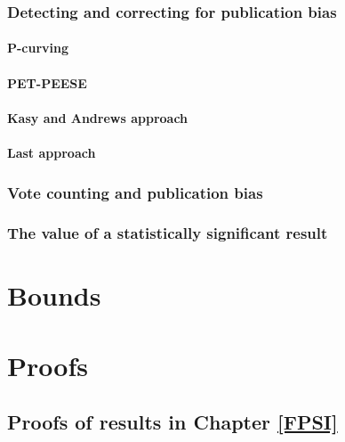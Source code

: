 \documentclass[]{book}
\theoremstyle{definition}
\theoremstyle{definition}
\theoremstyle{definition}
\theoremstyle{remark}
\begin{document}
\subsection{Detecting and correcting for publication
bias}\label{detecting-and-correcting-for-publication-bias}

\subsubsection{P-curving}\label{p-curving}

\subsubsection{PET-PEESE}\label{pet-peese}

\subsubsection{Kasy and Andrews
approach}\label{kasy-and-andrews-approach}

\subsubsection{Last approach}\label{last-approach}

\subsection{Vote counting and publication
bias}\label{vote-counting-and-publication-bias}

\subsection{The value of a statistically significant
result}\label{the-value-of-a-statistically-significant-result}

\chapter{Bounds}\label{Bounds}

\appendix


\chapter{Proofs}\label{proofs}

\section{Proofs of results in Chapter
\ref{FPSI}}\label{proofs-of-results-in-chapter-reffpsi}
\end{document}
